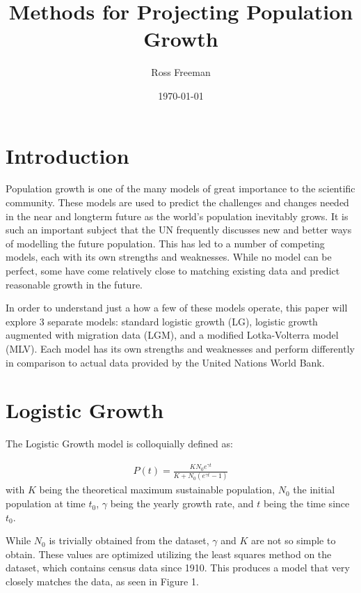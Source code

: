 \documentclass[a4paper]{article}
\begin{document}
\title{Methods for Projecting Population Growth}
\author{Ross Freeman}
\date{\today}
\maketitle
\section{Introduction}

Population growth is one of the many models of great importance to the scientific community. These models are used to predict the challenges and changes needed in the near and longterm future as the world's population inevitably grows. It is such an important subject that the UN frequently discusses new and better ways of modelling the future population. This has led to a number of competing models, each with its own strengths and weaknesses. While no model can be perfect, some have come relatively close to matching existing data and predict reasonable growth in the future. 

In order to understand just a how a few of these models operate, this paper will explore 3 separate models: standard logistic growth (LG), logistic growth augmented with migration data (LGM), and a modified Lotka-Volterra model (MLV). Each model has its own strengths and weaknesses and perform differently in comparison to actual data provided by the United Nations World Bank.

\section{Logistic Growth}

The Logistic Growth model is colloquially defined as:

\begin{align}
\label{eq:log-growth}
	P(t) = \frac{K N_0 e^{\gamma t}}{K + N_0 (e^{\gamma t} - 1)}
\end{align}
with $K$ being the theoretical maximum sustainable population, $N_0$ the initial population at time $t_0$, $\gamma$ being the yearly growth rate, and $t$ being the time since $t_0$.

While $N_0$ is trivially obtained from the dataset, $\gamma$ and $K$ are not so simple to obtain. These values are optimized utilizing the least squares method on the dataset, which contains census data since 1910. This produces a model that very closely matches the data, as seen in Figure 1.

\end{document}
